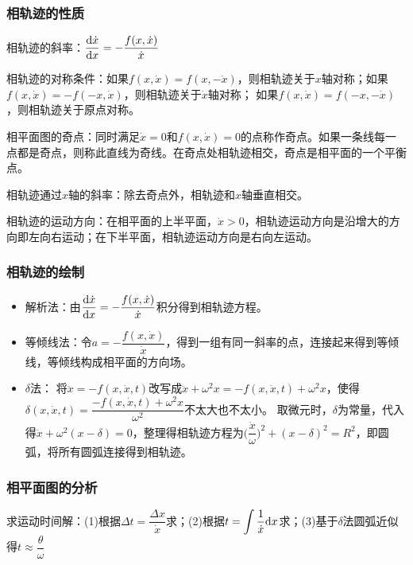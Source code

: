 \documentclass[11pt,a4paper]{ctexart}
\renewcommand{\d}{{\rm d}}
\begin{document}
        \subsubsection{相轨迹的性质}
            相轨迹的斜率：$\dfrac{\d\dot{x}}{\d x}=-\dfrac{f(x,\dot{x})}{\dot{x}}$

            相轨迹的对称条件：如果$f(x,\dot{x})=f(x,-\dot{x})$，则相轨迹关于$x$轴对称；如果$f(x,\dot{x})=-f(-x,\dot{x})$，则相轨迹关于$\dot{x}$轴对称；
            如果$f(x,\dot{x})=f(-x,-\dot{x})$，则相轨迹关于原点对称。

            相平面图的奇点：同时满足$\dot{x}=0$和$f(x,\dot{x})=0$的点称作奇点。如果一条线每一点都是奇点，则称此直线为奇线。在奇点处相轨迹相交，奇点是相平面的一个平衡点。

            相轨迹通过$x$轴的斜率：除去奇点外，相轨迹和$x$轴垂直相交。

            相轨迹的运动方向：在相平面的上半平面，$\dot{x}>0$，相轨迹运动方向是沿增大的方向即左向右运动；在下半平面，相轨迹运动方向是右向左运动。
        \subsubsection{相轨迹的绘制}
            \begin{itemize}
                \item 解析法：由$\dfrac{\d\dot{x}}{\d x}=-\dfrac{f(x,\dot{x})}{\dot{x}}$积分得到相轨迹方程。
                \item 等倾线法：令$a=-\dfrac{f(x,\dot{x})}{\dot{x}}$，得到一组有同一斜率的点，连接起来得到等倾线，等倾线构成相平面的方向场。
                \item $\delta$法：
                将$\ddot{x}=-f(x,\dot{x},t)$改写成$\ddot{x}+\omega^2x=-f(x,\dot{x},t)+\omega^2x$，使得$\delta(x,\dot{x},t)=\dfrac{-f(x,\dot{x},t)+\omega^2x}{\omega^2}$不太大也不太小。
                取微元时，$\delta$为常量，代入得$\ddot{x}+\omega^2(x-\delta)=0$，整理得相轨迹方程为$\big(\dfrac{\dot{x}}{\omega}\big)^2+(x-\delta)^2=R^2$，即圆弧，将所有圆弧连接得到相轨迹。  
            \end{itemize}        
        \subsubsection{相平面图的分析}
            求运动时间解：(1)根据$\Delta t=\dfrac{\Delta x}{\dot{x}}$求；(2)根据$\displaystyle t=\int\dfrac{1}{\dot{x}}\d x$求；(3)基于$\delta$法圆弧近似得$t\approx\dfrac{\theta}{\omega}$
\end{document}
